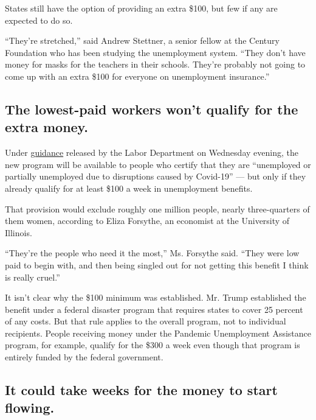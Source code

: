 States still have the option of providing an extra \$100, but few if any
are expected to do so.

``They're stretched,'' said Andrew Stettner, a senior fellow at the
Century Foundation who has been studying the unemployment system. ``They
don't have money for masks for the teachers in their schools. They're
probably not going to come up with an extra \$100 for everyone on
unemployment insurance.''

\hypertarget{the-lowest-paid-workers-wont-qualify-for-the-extra-money}{%
\subsection{The lowest-paid workers won't qualify for the extra
money.}\label{the-lowest-paid-workers-wont-qualify-for-the-extra-money}}

Under
\href{https://wdr.doleta.gov/directives/attach/UIPL/UIPL_27-20.pdf}{guidance}
released by the Labor Department on Wednesday evening, the new program
will be available to people who certify that they are ``unemployed or
partially unemployed due to disruptions caused by Covid-19'' --- but
only if they already qualify for at least \$100 a week in unemployment
benefits.

That provision would exclude roughly one million people, nearly
three-quarters of them women, according to Eliza Forsythe, an economist
at the University of Illinois.

``They're the people who need it the most,'' Ms. Forsythe said. ``They
were low paid to begin with, and then being singled out for not getting
this benefit I think is really cruel.''

It isn't clear why the \$100 minimum was established. Mr. Trump
established the benefit under a federal disaster program that requires
states to cover 25 percent of any costs. But that rule applies to the
overall program, not to individual recipients. People receiving money
under the Pandemic Unemployment Assistance program, for example, qualify
for the \$300 a week even though that program is entirely funded by the
federal government.

\hypertarget{it-could-take-weeks-for-the-money-to-start-flowing}{%
\subsection{It could take weeks for the money to start
flowing.}\label{it-could-take-weeks-for-the-money-to-start-flowing}}

